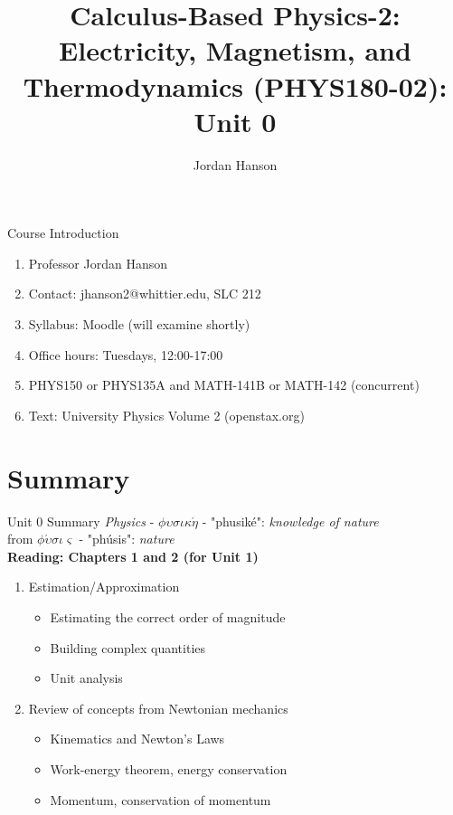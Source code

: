\documentclass{beamer}
\title{Calculus-Based Physics-2: Electricity, Magnetism, and Thermodynamics (PHYS180-02): Unit 0}
\author{Jordan Hanson}
\institute{Whittier College Department of Physics and Astronomy}
\begin{document}
\maketitle

\begin{frame}{Course Introduction}
\begin{enumerate}
\item Professor Jordan Hanson
\item Contact: jhanson2@whittier.edu, SLC 212
\item Syllabus: Moodle (will examine shortly)
\item Office hours: Tuesdays, 12:00-17:00
\item PHYS150 or PHYS135A and MATH-141B or MATH-142 (concurrent)
\item Text: University Physics Volume 2 (openstax.org)
\end{enumerate}
\end{frame}

\section{Summary}

\begin{frame}{Unit 0 Summary}
\textit{Physics} - $\phi\upsilon\sigma\iota\kappa\acute{\eta}$ - "phusik\'e": \textit{knowledge of nature} \\
from $\phi\acute{\upsilon}\sigma\iota\varsigma$ - "ph\'usis": \textit{nature} \\
\textbf{Reading: Chapters 1 and 2 (for Unit 1)}
\begin{enumerate}
\item Estimation/Approximation
\begin{itemize}
\item \alert{Estimating} the correct order of magnitude
\item \alert{Building} complex quantities
\item \alert{Unit analysis}
\end{itemize}
\item Review of concepts from Newtonian mechanics
\begin{itemize}
\item Kinematics and \alert{Newton's Laws}
\item Work-energy theorem, energy conservation
\item Momentum, conservation of momentum
\end{itemize}
\end{enumerate}
\end{frame}
\end{document}
